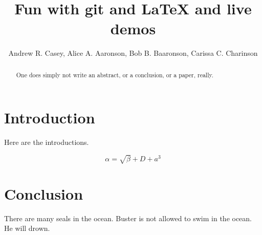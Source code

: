 \documentclass{article}
\begin{document}
\title{Fun with git and \LaTeX{} and live demos}
\author{Andrew R. Casey, Alice A. Aaronson, Bob B. Baaronson, Carissa C. Charinson}

\maketitle

\begin{abstract}
One does simply not write an abstract, or a conclusion, or a paper, really.
\end{abstract}

\section{Introduction}
Here are the introductions.

\begin{equation}
    \label{simple_equation}
    \alpha = \sqrt{ \beta } + D + a^3
\end{equation}


\section{Conclusion}
There are many seals in the ocean. Buster is not allowed to swim in the ocean. He will drown.
\end{document}
